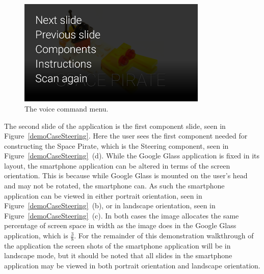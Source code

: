 	\begin{figure}[H]%
		\centering
		\includegraphics[width=90mm]{images/demoCase/glassVoiceCommand}
		\caption{The voice command menu.}
		\label{demoCaseVoiceCommand}
	\end{figure}


The second slide of the application is the first component slide, seen in Figure~\ref{demoCaseSteering}. Here the user sees the first component needed for constructing the Space Pirate, which is the Steering component, seen in Figure~\ref{demoCaseSteering}~(d). While the Google Glass application is fixed in its layout, the smartphone application can be altered in terms of the screen orientation. This is because while Google Glass is mounted on the user's head and may not be rotated, the smartphone can. As such the smartphone application can be viewed in either portrait orientation, seen in Figure~\ref{demoCaseSteering}~(b), or in landscape orientation, seen in Figure~\ref{demoCaseSteering}~(c). In both cases the image allocates the same percentage of screen space in width as the image does in the Google Glass application, which is \(\frac{3}{8}\). For the remainder of this demonstration walkthrough of the application the screen shots of the smartphone application will be in landscape mode, but it should be noted that all slides in the smartphone application may be viewed in both portrait orientation and landscape orientation.

